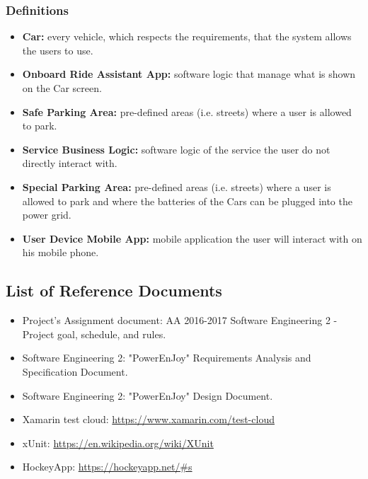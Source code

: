 \subsubsection{Definitions}
\begin{itemize}
    \item \textbf{Car:} every vehicle, which respects the requirements, that the system allows the users to use.
    \item \textbf{Onboard Ride Assistant App:} software logic that manage what is shown on the Car screen.
    \item \textbf{Safe Parking Area:} pre-defined areas (i.e. streets) where a user is allowed to park.
    \item \textbf{Service Business Logic:} software logic of the service the user do not directly interact with.
    \item \textbf{Special Parking Area:} pre-defined areas (i.e. streets) where a user is allowed to park and where the batteries of the Cars can be plugged into the power grid.
    \item \textbf{User Device Mobile App:} mobile application the user will interact with on his mobile phone.
\end{itemize}


\subsection{List of Reference Documents}
\begin{itemize}
    \item Project’s Assignment document: AA 2016-2017 Software Engineering 2 - Project goal, schedule, and rules.
    \item Software Engineering 2: "PowerEnJoy" Requirements Analysis and Specification Document.
    \item Software Engineering 2: "PowerEnJoy" Design Document.
    \item Xamarin test cloud: \url{https://www.xamarin.com/test-cloud}
    \item xUnit: \url{https://en.wikipedia.org/wiki/XUnit}
    \item HockeyApp: \url{https://hockeyapp.net/#s}
\end{itemize}